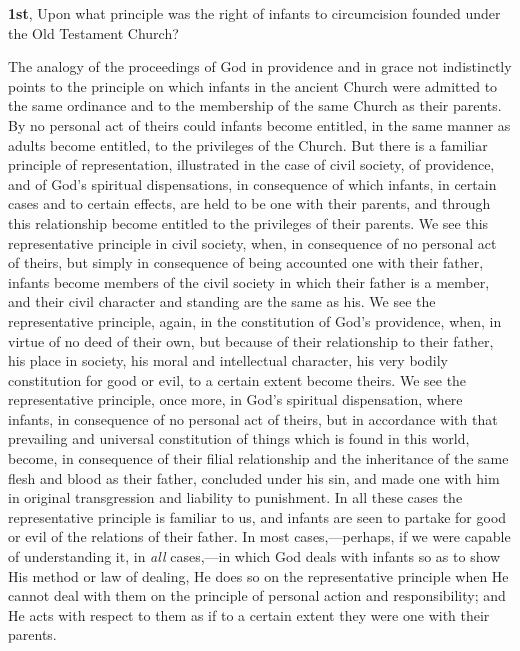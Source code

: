 \documentclass[
]{book}
\begin{document}
\textbf{1st}, Upon what principle was the right of infants to circumcision founded under the Old Testament Church?

The analogy of the proceedings of God in providence and in grace not indistinctly points to the principle on which infants in the ancient Church were admitted to the same ordinance and to the membership of the same Church as their parents. By no personal act of theirs could infants become entitled, in the same manner as adults become entitled, to the privileges of the Church. But there is a familiar principle of representation, illustrated in the case of civil society, of providence, and of God's spiritual dispensations, in consequence of which infants, in certain cases and to certain effects, are held to be one with their parents, and through this relationship become entitled to the privileges of their parents. We see this representative principle in civil society, when, in consequence of no personal act of theirs, but simply in consequence of being accounted one with their father, infants become members of the civil society in which their father is a member, and their civil character and standing are the same as his. We see the representative principle, again, in the constitution of God's providence, when, in virtue of no deed of their own, but because of their relationship to their father, his place in society, his moral and intellectual character, his very bodily constitution for good or evil, to a certain extent become theirs. We see the representative principle, once more, in God's spiritual dispensation, where infants, in consequence of no personal act of theirs, but in accordance with that prevailing and universal constitution of things which is found in this world, become, in consequence of their filial relationship and the inheritance of the same flesh and blood as their father, concluded under his sin, and made one with him in original transgression and liability to punishment. In all these cases the representative principle is familiar to us, and infants are seen to partake for good or evil of the relations of their father. In most cases,---perhaps, if we were capable of understanding it, in \emph{all} cases,---in which God deals with infants so as to show His method or law of dealing, He does so on the representative principle when He cannot deal with them on the principle of personal action and responsibility; and He acts with respect to them as if to a certain extent they were one with their parents.
\end{document}
